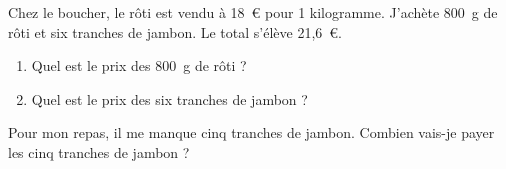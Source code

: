 Chez le boucher, le rôti est vendu à 18~\textgreek{\euro} pour 1
kilogramme. J'achète 800~g de rôti et six tranches de jambon. Le
total s'élève 21,6~\textgreek{\euro}.
\begin{myenumerate}
\item
\begin{enumerate}
\item Quel est le prix des 800~g de rôti ?
\item Quel est le prix des six tranches de jambon ?
\end{enumerate}
\item Pour mon repas, il me manque cinq tranches de jambon. Combien
vais-je payer les cinq tranches de jambon ?
\end{myenumerate}